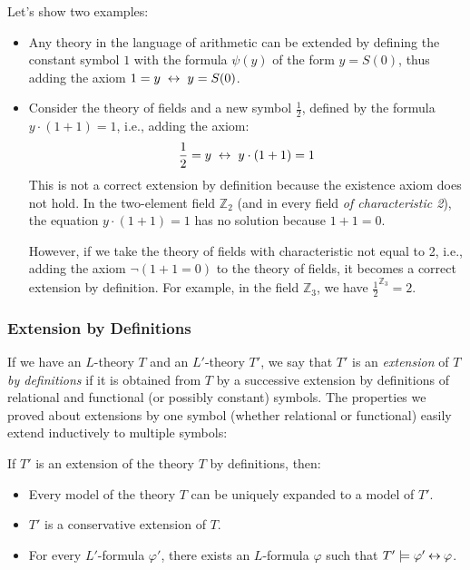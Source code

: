 \begin{example}
    Let's show two examples:
    \begin{itemize}
        \item Any theory in the language of arithmetic can be extended by defining the constant symbol $1$ with the formula $\psi(y)$ of the form $y=S(0)$, thus adding the axiom $1=y\ \liff\ y=S(0)$.
        \item Consider the theory of fields and a new symbol $\frac{1}{2}$, defined by the formula $y\cdot (1+1)=1$, i.e., adding the axiom:
        $$
        \frac{1}{2}=y\ \liff\ y\cdot (1+1)=1
        $$
        This is not a correct extension by definition because the existence axiom does not hold. In the two-element field $\mathbb Z_2$ (and in every field \emph{of characteristic 2}), the equation $y\cdot (1+1)=1$ has no solution because $1+1=0$.
        
        
        However, if we take the theory of fields with characteristic not equal to 2, i.e., adding the axiom $\neg (1+1=0)$ to the theory of fields, it becomes a correct extension by definition. For example, in the field $\mathbb Z_3$, we have $\frac{1}{2}^{\mathbb Z_3}=2$.
    \end{itemize}
\end{example}


\subsubsection*{Extension by Definitions}

If we have an $L$-theory $T$ and an $L'$-theory $T'$, we say that $T'$ is an \emph{extension} of $T$ \emph{by definitions} if it is obtained from $T$ by a successive extension by definitions of relational and functional (or possibly constant) symbols. The properties we proved about extensions by one symbol (whether relational or functional) easily extend inductively to multiple symbols:

\begin{corollary}
   If $T'$ is an extension of the theory $T$ by definitions, then:
   \begin{itemize}
    \item Every model of the theory $T$ can be uniquely expanded to a model of $T'$.
    \item $T'$ is a conservative extension of $T$.
    \item For every $L'$-formula $\varphi'$, there exists an $L$-formula $\varphi$ such that $T'\models\varphi'\mathbin{\leftrightarrow}\varphi$.
   \end{itemize}
\end{corollary}

